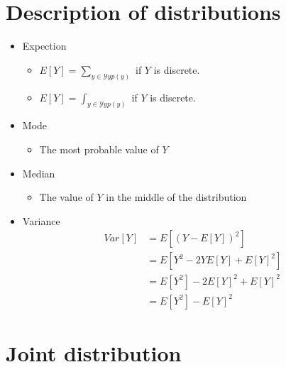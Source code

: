 \documentclass[
  letterpaper,
  DIV=11,
  numbers=noendperiod]{scrreprt}
\providecommand{\tightlist}{%
  \setlength{\itemsep}{0pt}\setlength{\parskip}{0pt}}\usepackage{longtable,booktabs,array}
\begin{document}
\hypertarget{description-of-distributions}{%
\section{Description of
distributions}\label{description-of-distributions}}

\begin{itemize}
\tightlist
\item
  Expection

  \begin{itemize}
  \tightlist
  \item
    \(E[Y] = \sum_{y\in\mathcal{Y}yp(y)}\) if \(Y\) is discrete.
  \item
    \(E[Y] = \int_{y\in\mathcal{Y}yp(y)}\) if \(Y\) is discrete.
  \end{itemize}
\item
  Mode

  \begin{itemize}
  \tightlist
  \item
    The most probable value of \(Y\)
  \end{itemize}
\item
  Median

  \begin{itemize}
  \tightlist
  \item
    The value of \(Y\) in the middle of the distribution
  \end{itemize}
\item
  Variance \[\begin{align}
       Var[Y] &= E[(Y-E[Y])^2]\\
              &= E[Y^2-2YE[Y] + E[Y]^2]\\
              &= E[Y^2] - 2E[Y]^2 + E[Y]^2\\ 
              &= E[Y^2] - E[Y]^2
   \end{align}\]
\end{itemize}

\hypertarget{joint-distribution}{%
\section{Joint distribution}\label{joint-distribution}}
\end{document}

